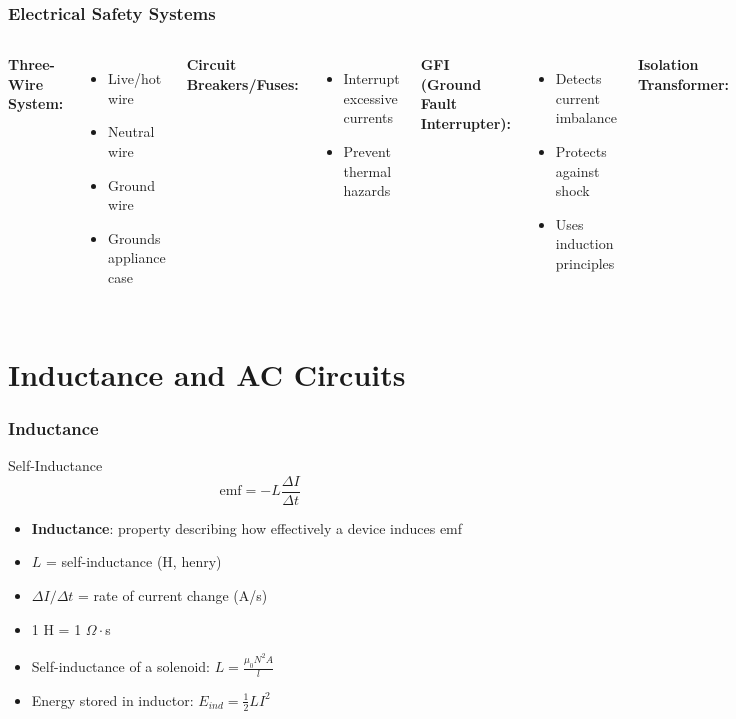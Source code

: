 \documentclass{beamer}
\begin{document}
\begin{frame}
\frametitle{Electrical Safety Systems}
\begin{columns}
\textbf{Three-Wire System:}
\begin{itemize}
    \item Live/hot wire
    \item Neutral wire
    \item Ground wire
    \item Grounds appliance case
\end{itemize}

\textbf{Circuit Breakers/Fuses:}
\begin{itemize}
    \item Interrupt excessive currents
    \item Prevent thermal hazards
\end{itemize}
\textbf{GFI (Ground Fault Interrupter):}
\begin{itemize}
    \item Detects current imbalance
    \item Protects against shock
    \item Uses induction principles
\end{itemize}

\textbf{Isolation Transformer:}
\begin{itemize}
    \item Insulates device from source
    \item Prevents ground loops
\end{itemize}
\end{columns}
\end{frame}

\section{Inductance and AC Circuits}

\begin{frame}
\frametitle{Inductance}
\begin{block}{Self-Inductance}
\begin{equation}
\text{emf} = -L\frac{\Delta I}{\Delta t}
\end{equation}
\end{block}
\begin{itemize}
    \item \textbf{Inductance}: property describing how effectively a device induces emf
    \item $L$ = self-inductance (H, henry)
    \item $\Delta I/\Delta t$ = rate of current change (A/s)
    \item 1 H = 1 $\Omega\cdot$s
    \item Self-inductance of a solenoid: $L = \frac{\mu_0N^2A}{l}$
    \item Energy stored in inductor: $E_{ind} = \frac{1}{2}LI^2$
\end{itemize}
\end{frame}
\end{document}
